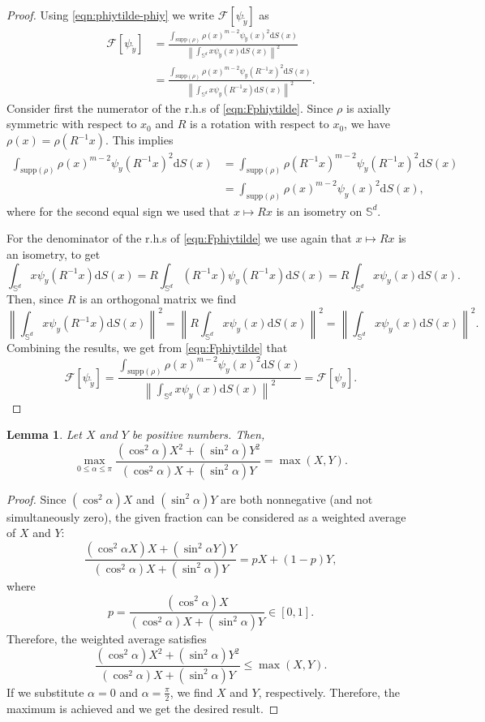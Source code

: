\documentclass[11pt]{amsart}
\newtheorem{lemma}{Lemma}[section]
\newcommand{\bbs}{\mathbb S}
\newcommand{\dx}{\mathrm{d}S (x)}
\newcommand{\supp}{\mathrm{supp}(\rho)}
\newcommand{\dm}{d} %
\begin{document}
\begin{proof}
Using \eqref{eqn:phiytilde-phiy} we write 
$\mathcal{F}[\psi_{\tilde{y}}]$ as 
\begin{equation}
\begin{aligned}
\mathcal{F}[\psi_{\tilde{y}}]&=\frac{\int_{\supp}\rho(x)^{m-2}\psi_{\tilde{y}}(x)^2\dx}{\left \| \int_{\bbs^\dm} x \psi_{\tilde{y}}(x) \dx \right \|^2}\\[2pt]
&=\frac{\int_{\supp}\rho(x)^{m-2}\psi_{y}(R^{-1}x)^2\dx}{\left \| \int_{\bbs^\dm} x \psi_{y}(R^{-1}x) \dx \right \|^2}.
\end{aligned}
\label{eqn:Fphiytilde}
\end{equation}
Consider first the numerator of the r.h.s of \eqref{eqn:Fphiytilde}. Since $\rho$ is axially symmetric with respect to $x_0$ and $R$ is a rotation with respect to $x_0$, we have $\rho(x)=\rho(R^{-1}x)$. This implies
\begin{align*}
\int_{\supp}\rho(x)^{m-2}\psi_{y}(R^{-1}x)^2\dx 
& =\int_{\supp}\rho(R^{-1}x)^{m-2}\psi_{y}(R^{-1}x)^2\dx \\
& = \int_{\supp}\rho(x)^{m-2}\psi_{y}(x)^2\dx,
\end{align*}
where for the second equal sign we used that $x\mapsto Rx$ is an isometry on $\bbs^\dm$. 

For the denominator of the r.h.s of \eqref{eqn:Fphiytilde} we use again that $x\mapsto Rx$ is an isometry, to get
\[
\int_{\bbs^\dm} x \psi_{y}(R^{-1}x) \dx=R\int_{\bbs^\dm} (R^{-1}x) \psi_{y}(R^{-1}x) \dx=R\int_{\bbs^\dm} x \psi_{y}(x) \dx.
\]
Then, since $R$ is an orthogonal matrix we find
\[
\left\|\int_{\bbs^\dm} x \psi_{y}(R^{-1}x) \dx\right\|^2=\left\|R\int_{\bbs^\dm} x \psi_{y}(x) \dx\right\|^2=\left\|\int_{\bbs^\dm} x \psi_{y}(x) \dx\right\|^2.
\]
Combining the results, we get from \eqref{eqn:Fphiytilde} that
\[
\mathcal{F}[\psi_{\tilde{y}}]=\frac{\int_{\supp}\rho(x)^{m-2}\psi_{y}(x)^2\dx}{\left\|\int_{\bbs^\dm} x \psi_{y}(x) \dx\right\|^2}=\mathcal{F}[\psi_y].
\]
\end{proof}

\begin{lemma}\label{lem:w-average}
Let $X$ and $Y$ be positive numbers. Then,
\[
\max_{0\leq\alpha\leq \pi}\frac{(\cos^2\alpha) X^2+ (\sin^2\alpha) Y^2}{(\cos^2\alpha) X+(\sin^2\alpha) Y}=\max(X,Y).
\]
\end{lemma}
\begin{proof}
Since $(\cos^2\alpha) X$ and $(\sin^2\alpha) Y$ are both nonnegative (and not simultaneously zero), the given fraction can be considered as a weighted average of $X$ and $Y$:
\[
\frac{(\cos^2\alpha X)X+(\sin^2\alpha Y)Y}{(\cos^2\alpha) X+(\sin^2\alpha) Y}=pX+(1-p)Y,
\]
where
\[
p=\frac{(\cos^2\alpha) X}{(\cos^2\alpha) X+(\sin^2\alpha) Y}\in[0,1].
\]
Therefore, the weighted average satisfies
\[
\frac{(\cos^2\alpha) X^2+(\sin^2\alpha) Y^2}{(\cos^2\alpha) X+(\sin^2\alpha) Y}\leq\max(X,Y).
\]
If we substitute $\alpha=0$ and $\alpha=\frac{\pi}{2}$, we find $X$ and $Y$, respectively. Therefore, the maximum is achieved and we get the desired result.
\end{proof}
\end{document}
